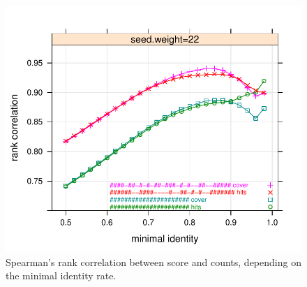 \begin{figure}[h]
	\centering
              
		\includegraphics[width=\columnwidth]{images/3.2/rank-cor-seed-weight-22.pdf}
              

	\caption{Spearman's rank correlation between score and counts, depending on
  the minimal identity rate. 
}\label{spearman}
\end{figure}
